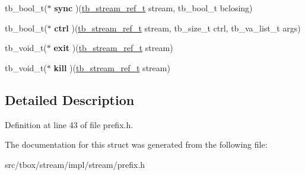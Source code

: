 \begin{DoxyCompactItemize}
\item 
\hypertarget{structtb__stream__impl__t_a90d2c7397664a5834058cbd1e226cec0}{tb\-\_\-bool\-\_\-t($\ast$ {\bfseries sync} )(\hyperlink{structtb__stream__ref__t}{tb\-\_\-stream\-\_\-ref\-\_\-t} stream, tb\-\_\-bool\-\_\-t bclosing)}\label{structtb__stream__impl__t_a90d2c7397664a5834058cbd1e226cec0}

\item 
\hypertarget{structtb__stream__impl__t_a18065e31046a76410241523e3b158dd3}{tb\-\_\-bool\-\_\-t($\ast$ {\bfseries ctrl} )(\hyperlink{structtb__stream__ref__t}{tb\-\_\-stream\-\_\-ref\-\_\-t} stream, tb\-\_\-size\-\_\-t ctrl, tb\-\_\-va\-\_\-list\-\_\-t args)}\label{structtb__stream__impl__t_a18065e31046a76410241523e3b158dd3}

\item 
\hypertarget{structtb__stream__impl__t_a1168d9e96fdaa153d25c404b5cbd5ebf}{tb\-\_\-void\-\_\-t($\ast$ {\bfseries exit} )(\hyperlink{structtb__stream__ref__t}{tb\-\_\-stream\-\_\-ref\-\_\-t} stream)}\label{structtb__stream__impl__t_a1168d9e96fdaa153d25c404b5cbd5ebf}

\item 
\hypertarget{structtb__stream__impl__t_affcd43b0307b55a5d25da02bf38a8602}{tb\-\_\-void\-\_\-t($\ast$ {\bfseries kill} )(\hyperlink{structtb__stream__ref__t}{tb\-\_\-stream\-\_\-ref\-\_\-t} stream)}\label{structtb__stream__impl__t_affcd43b0307b55a5d25da02bf38a8602}

\end{DoxyCompactItemize}


\subsection{Detailed Description}


Definition at line 43 of file prefix.\-h.



The documentation for this struct was generated from the following file\-:\begin{DoxyCompactItemize}
\item 
src/tbox/stream/impl/stream/prefix.\-h\end{DoxyCompactItemize}
